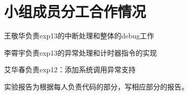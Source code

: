 \documentclass[11pt]{article}
\begin{document}
         

      
\vspace{1ex}

\section{小组成员分工合作情况}
王敬华负责exp13的中断处理和整体的debug工作

李霄宇负责exp13的异常处理和计时器指令的实现

艾华春负责exp12：添加系统调用异常支持

实验报告为根据每人负责代码的部分，写相应部分的报告。
\end{document}
